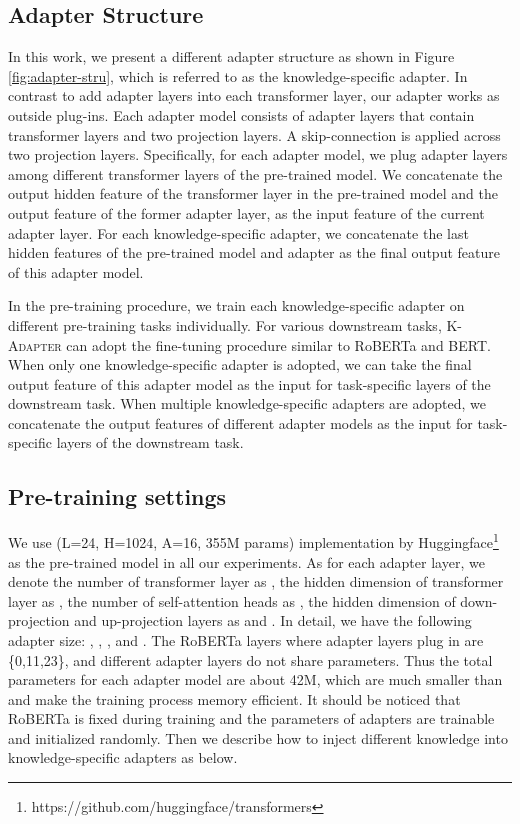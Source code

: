 \documentclass[11pt,a4paper]{article}
\begin{document}
\subsection{Adapter Structure}
In this work, we present a different adapter structure as shown in Figure \ref{fig:adapter-stru}, which is referred to as the knowledge-specific adapter. In contrast to \citet{houlsby2019parameter} add adapter layers into each transformer layer, our adapter works as outside plug-ins. Each adapter model consists of  adapter layers that contain  transformer \citep{vaswani2017attention} layers and two projection layers. A skip-connection is applied across two projection layers. Specifically, for each adapter model, we plug adapter layers among different transformer layers of the pre-trained model. We concatenate the output hidden feature of the transformer layer in the pre-trained model and the output feature of the former adapter layer, as the input feature of the current adapter layer. 
For each knowledge-specific adapter, we concatenate the last hidden features of the pre-trained model and adapter as the final output feature of this adapter model. 

In the pre-training procedure, we train each knowledge-specific adapter on different pre-training tasks individually. For various downstream tasks, \textsc{K-Adapter} can adopt the fine-tuning procedure similar to RoBERTa and BERT. When only one knowledge-specific adapter is adopted, we can take the final output feature of this adapter model as the input for task-specific layers of the downstream task. When multiple knowledge-specific adapters are adopted, we concatenate the output features of different adapter models as the input for task-specific layers of the downstream task.


\subsection{Pre-training settings}
We use  (L=24, H=1024, A=16, 355M params) implementation by Huggingface\footnote{https://github.com/huggingface/transformers} as the pre-trained model in all our experiments. 
As for each adapter layer, we denote the number of transformer layer as , the hidden dimension of transformer layer as , the number of self-attention heads as , the hidden dimension of down-projection and up-projection layers as  and .
In detail, we have the following adapter size: , , ,  and . The RoBERTa layers where adapter layers plug in are \{0,11,23\}, and different adapter layers do not share parameters. Thus the total parameters for each adapter model are about 42M, which are much smaller than  and make the training process memory efficient. It should be noticed that RoBERTa is fixed during training and the parameters of adapters are trainable and initialized randomly. Then we describe how to inject different knowledge into knowledge-specific adapters as below.
\end{document}

